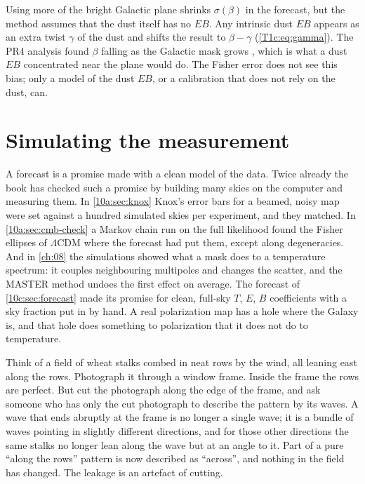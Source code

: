\begin{pitfall}
Using more of the bright Galactic plane shrinks $\sigma(\beta)$ in the forecast, but the method assumes that the dust
itself has no $EB$. Any intrinsic dust $EB$ appears as an extra twist $\gamma$ of the dust and shifts the result to
$\beta-\gamma$ (\cref{T1c:eq:gamma}). The PR4 analysis found $\beta$ falling as the Galactic mask grows
\cite{DiegoPalazuelos2022}, which is what a dust $EB$ concentrated near the plane would do. The Fisher error does not
see this bias; only a model of the dust $EB$, or a calibration that does not rely on the dust, can.
\end{pitfall}
\section{Simulating the measurement}
\label{10c:sec:mc}

A forecast is a promise made with a clean model of the data. Twice already the book has checked such a promise by
building many skies on the computer and measuring them. In \cref{10a:sec:knox} Knox's error bars for a beamed,
noisy map were set against a hundred simulated skies per experiment, and they matched. In \cref{10a:sec:cmb-check} a
Markov chain run on the full likelihood found the Fisher ellipses of $\Lambda$CDM where the forecast had put them,
except along degeneracies. And in \cref{ch:08} the simulations showed what a mask does to a temperature spectrum:
it couples neighbouring multipoles and changes the scatter, and the MASTER method undoes the first effect on
average. The forecast of \cref{10c:sec:forecast} made its promise for clean, full-sky $T$, $E$, $B$ coefficients with
a sky fraction put in by hand. A real polarization map has a hole where the Galaxy is, and that hole does something
to polarization that it does not do to temperature.

Think of a field of wheat stalks combed in neat rows by the wind, all leaning east along the rows. Photograph it
through a window frame. Inside the frame the rows are perfect. But cut the photograph along the edge of the frame,
and ask someone who has only the cut photograph to describe the pattern by its waves. A wave that ends abruptly at
the frame is no longer a single wave; it is a bundle of waves pointing in slightly different directions, and for
those other directions the same stalks no longer lean along the wave but at an angle to it. Part of a pure
``along the rows'' pattern is now described as ``across'', and nothing in the field has changed. The leakage is an
artefact of cutting.


